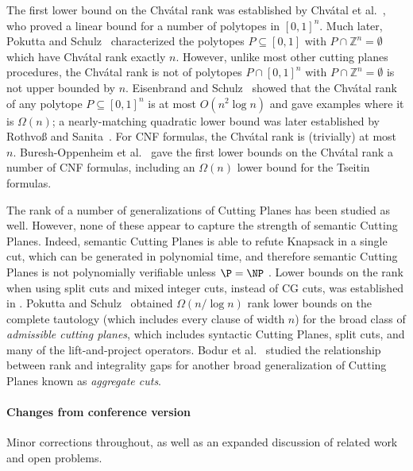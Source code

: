 The first lower bound on the Chv\'{a}tal rank was established by Chv\'{a}tal et al.~\cite{ChvatalCH89}, who proved a linear bound for a number of polytopes in $[0,1]^n$. Much later, Pokutta and Schulz~\cite{PokuttaS11a} characterized the polytopes $P \subseteq [0,1]$ with $P \cap \mathbb{Z}^n = \emptyset$ which have Chv\'{a}tal rank exactly $n$. However, unlike most other cutting planes procedures, the Chv\'{a}tal rank is not of polytopes $P \cap [0,1]^n$ with $P \cap \mathbb{Z}^n = \emptyset$ is not upper bounded by $n$. Eisenbrand and Schulz~\cite{EisenbrandS99} showed that the Chv\'{a}tal rank of any polytope $P \subseteq [0,1]^n$ is at most $O(n^2 \log n)$ and gave examples where it is $\Omega(n)$; a nearly-matching quadratic lower bound was later established by Rothvo{\ss} and Sanita~\cite{RothvossS13}.
For CNF formulas, the Chv\'{a}tal rank is (trivially) at most $n$. Buresh-Oppenheim et al.~\cite{BGHMP06} gave the first lower bounds on the Chv\'{a}tal rank  a number of CNF formulas, including an $\Omega(n)$ lower bound for the Tseitin formulas. 

The rank of a number of generalizations of Cutting Planes has been studied as well. However, none of these appear to capture the strength of semantic Cutting Planes. %
Indeed, semantic Cutting Planes is able to refute Knapsack in a single cut, which can be generated
%
in polynomial time,  %
and therefore semantic Cutting Planes is not polynomially verifiable unless $\P = \NP$ \cite{FilmusHL16}.
%
%
Lower bounds on the rank when using split cuts and mixed integer cuts, instead of CG cuts, was established in \cite{CornuejolsL02a}.  
Pokutta and Schulz~\cite{PokuttaS10} obtained $\Omega(n/\log n)$ rank lower bounds on the complete tautology (which includes every clause of width $n$) for the broad class of \emph{admissible cutting planes}, which includes syntactic Cutting Planes, split cuts, and many of the lift-and-project operators. Bodur et al.~\cite{BodurPDMP18} studied the relationship between rank and integrality gaps for another broad generalization of Cutting Planes known as \emph{aggregate cuts}. 

%
\paragraph{Changes from conference version \cite{conf-version}}

Minor corrections throughout, as well as an expanded discussion of related work and open problems.






